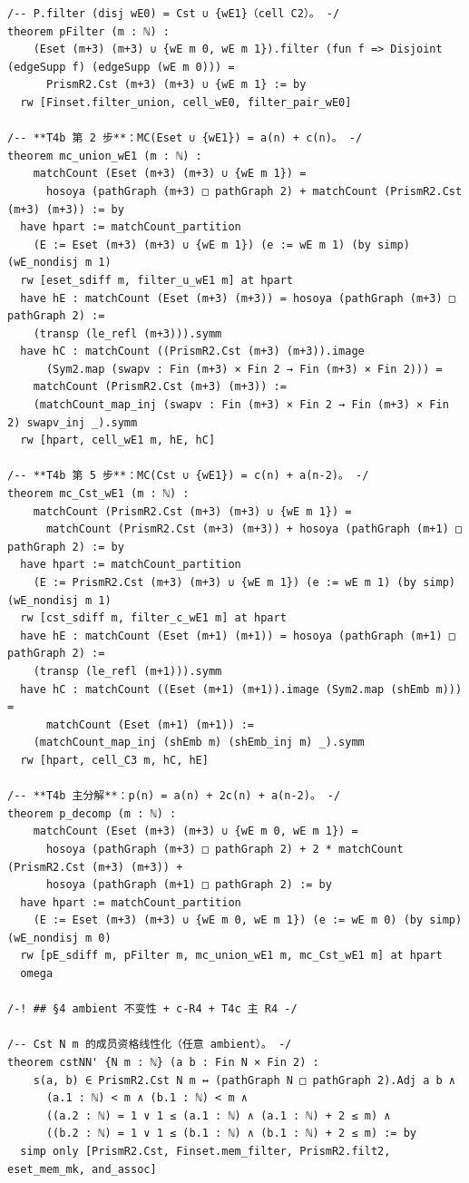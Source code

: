 \documentclass[11pt]{article}
\begin{document}
\begin{lstlisting}
/-- P.filter (disj wE0) = Cst ∪ {wE1}（cell C2）。 -/
theorem pFilter (m : ℕ) :
    (Eset (m+3) (m+3) ∪ {wE m 0, wE m 1}).filter (fun f => Disjoint (edgeSupp f) (edgeSupp (wE m 0))) =
      PrismR2.Cst (m+3) (m+3) ∪ {wE m 1} := by
  rw [Finset.filter_union, cell_wE0, filter_pair_wE0]

/-- **T4b 第 2 步**：MC(Eset ∪ {wE1}) = a(n) + c(n)。 -/
theorem mc_union_wE1 (m : ℕ) :
    matchCount (Eset (m+3) (m+3) ∪ {wE m 1}) =
      hosoya (pathGraph (m+3) □ pathGraph 2) + matchCount (PrismR2.Cst (m+3) (m+3)) := by
  have hpart := matchCount_partition
    (E := Eset (m+3) (m+3) ∪ {wE m 1}) (e := wE m 1) (by simp) (wE_nondisj m 1)
  rw [eset_sdiff m, filter_u_wE1 m] at hpart
  have hE : matchCount (Eset (m+3) (m+3)) = hosoya (pathGraph (m+3) □ pathGraph 2) :=
    (transp (le_refl (m+3))).symm
  have hC : matchCount ((PrismR2.Cst (m+3) (m+3)).image
      (Sym2.map (swapv : Fin (m+3) × Fin 2 → Fin (m+3) × Fin 2))) =
    matchCount (PrismR2.Cst (m+3) (m+3)) :=
    (matchCount_map_inj (swapv : Fin (m+3) × Fin 2 → Fin (m+3) × Fin 2) swapv_inj _).symm
  rw [hpart, cell_wE1 m, hE, hC]

/-- **T4b 第 5 步**：MC(Cst ∪ {wE1}) = c(n) + a(n-2)。 -/
theorem mc_Cst_wE1 (m : ℕ) :
    matchCount (PrismR2.Cst (m+3) (m+3) ∪ {wE m 1}) =
      matchCount (PrismR2.Cst (m+3) (m+3)) + hosoya (pathGraph (m+1) □ pathGraph 2) := by
  have hpart := matchCount_partition
    (E := PrismR2.Cst (m+3) (m+3) ∪ {wE m 1}) (e := wE m 1) (by simp) (wE_nondisj m 1)
  rw [cst_sdiff m, filter_c_wE1 m] at hpart
  have hE : matchCount (Eset (m+1) (m+1)) = hosoya (pathGraph (m+1) □ pathGraph 2) :=
    (transp (le_refl (m+1))).symm
  have hC : matchCount ((Eset (m+1) (m+1)).image (Sym2.map (shEmb m))) =
      matchCount (Eset (m+1) (m+1)) :=
    (matchCount_map_inj (shEmb m) (shEmb_inj m) _).symm
  rw [hpart, cell_C3 m, hC, hE]

/-- **T4b 主分解**：p(n) = a(n) + 2c(n) + a(n-2)。 -/
theorem p_decomp (m : ℕ) :
    matchCount (Eset (m+3) (m+3) ∪ {wE m 0, wE m 1}) =
      hosoya (pathGraph (m+3) □ pathGraph 2) + 2 * matchCount (PrismR2.Cst (m+3) (m+3)) +
      hosoya (pathGraph (m+1) □ pathGraph 2) := by
  have hpart := matchCount_partition
    (E := Eset (m+3) (m+3) ∪ {wE m 0, wE m 1}) (e := wE m 0) (by simp) (wE_nondisj m 0)
  rw [pE_sdiff m, pFilter m, mc_union_wE1 m, mc_Cst_wE1 m] at hpart
  omega

/-! ## §4 ambient 不变性 + c-R4 + T4c 主 R4 -/

/-- Cst N m 的成员资格线性化（任意 ambient）。 -/
theorem cstNN' {N m : ℕ} (a b : Fin N × Fin 2) :
    s(a, b) ∈ PrismR2.Cst N m ↔ (pathGraph N □ pathGraph 2).Adj a b ∧
      (a.1 : ℕ) < m ∧ (b.1 : ℕ) < m ∧
      ((a.2 : ℕ) = 1 ∨ 1 ≤ (a.1 : ℕ) ∧ (a.1 : ℕ) + 2 ≤ m) ∧
      ((b.2 : ℕ) = 1 ∨ 1 ≤ (b.1 : ℕ) ∧ (b.1 : ℕ) + 2 ≤ m) := by
  simp only [PrismR2.Cst, Finset.mem_filter, PrismR2.filt2, eset_mem_mk, and_assoc]


\end{lstlisting}
\end{document}
